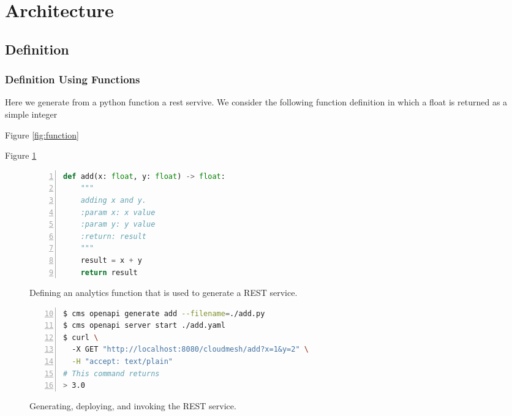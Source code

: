 


\section{Architecture}
\label{sec:architecture}


\subsection{Definition}


\subsubsection{Definition Using Functions}


Here we generate from a
python function a rest servive. We consider the following function
definition in which a float is returned as a simple integer

Figure \ref{fig:function}

Figure \ref{fig:deploy}

\begin{figure}[htb]
\bigskip
\begin{lstlisting}[language=Python,
                   basicstyle=\ttfamily\footnotesize,
                   numbers=left,                   
                   numbersep=5pt,
                   xleftmargin=5mm]
def add(x: float, y: float) -> float:
    """
    adding x and y.
    :param x: x value
    :param y: y value
    :return: result
    """
    result = x + y
    return result
\end{lstlisting}
\caption{Defining an analytics function that is used to generate a REST service.}
\label{fig:function}
\bigskip
\begin{lstlisting}[language=bash,
                   firstnumber=10,
                   basicstyle=\ttfamily\footnotesize,
                   numbers=left,                   
                   numbersep=5pt,
                   xleftmargin=5mm]
$ cms openapi generate add --filename=./add.py
$ cms openapi server start ./add.yaml 
$ curl \ 
  -X GET "http://localhost:8080/cloudmesh/add?x=1&y=2" \
  -H "accept: text/plain"
# This command returns
> 3.0
\end{lstlisting}

\caption{Generating, deploying, and invoking the REST service.}
\label{fig:deploy}

\end{figure}

